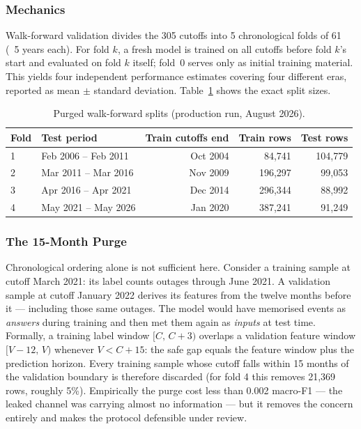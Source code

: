 \subsubsection{Mechanics}

Walk-forward validation divides the 305 cutoffs into 5 chronological folds of 61 (~5 years each). For fold $k$, a fresh model is trained on all cutoffs before fold $k$'s start and evaluated on fold $k$ itself; fold~0 serves only as initial training material. This yields four independent performance estimates covering four different eras, reported as mean $\pm$ standard deviation. Table~\ref{tab:wf_folds} shows the exact split sizes.

\begin{table}[htbp]
    \centering
    \caption{Purged walk-forward splits (production run, August 2026).}
    \label{tab:wf_folds}
    \begin{tabular}{llrrr}
        \toprule
        \textbf{Fold} & \textbf{Test period} & \textbf{Train cutoffs end} & \textbf{Train rows} & \textbf{Test rows} \\
        \midrule
        1 & Feb 2006 -- Feb 2011 & Oct 2004 & 84{,}741  & 104{,}779 \\
        2 & Mar 2011 -- Mar 2016 & Nov 2009 & 196{,}297 & 99{,}053  \\
        3 & Apr 2016 -- Apr 2021 & Dec 2014 & 296{,}344 & 88{,}992  \\
        4 & May 2021 -- May 2026 & Jan 2020 & 387{,}241 & 91{,}249  \\
        \bottomrule
    \end{tabular}
\end{table}

\subsubsection{The 15-Month Purge}

Chronological ordering alone is not sufficient here. Consider a training sample at cutoff March 2021: its label counts outages through June 2021. A validation sample at cutoff January 2022 derives its features from the twelve months before it --- including those same outages. The model would have memorised events as \emph{answers} during training and then met them again as \emph{inputs} at test time. Formally, a training label window $[C,\,C{+}3)$ overlaps a validation feature window $[V{-}12,\,V)$ whenever $V < C + 15$: the safe gap equals the feature window plus the prediction horizon. Every training sample whose cutoff falls within 15 months of the validation boundary is therefore discarded (for fold 4 this removes 21,369 rows, roughly 5\%). Empirically the purge cost less than 0.002 macro-F1 --- the leaked channel was carrying almost no information --- but it removes the concern entirely and makes the protocol defensible under review.

